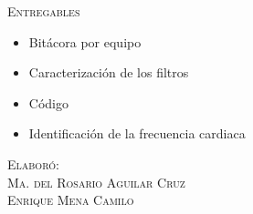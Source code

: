 \documentclass[10pt,letterpaper,spanish,twoside]{report}
\begin{document}
\textsc{Entregables}
\begin{itemize}
  \item Bitácora por equipo
  \item Caracterización de los filtros
  \item Código
  \item Identificación de la frecuencia cardiaca
\end{itemize}

\vfill
\begin{flushright}
\textsc{Elaboró:\\
Ma. del Rosario Aguilar Cruz\\
Enrique Mena Camilo}
\end{flushright}
\end{document}
